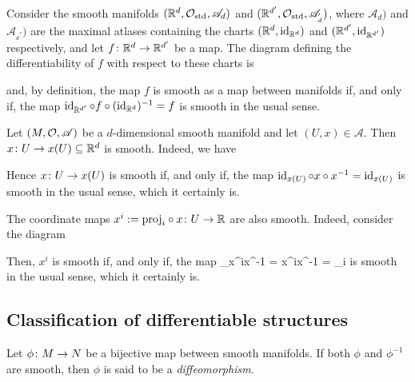 \be
Consider the smooth manifolds $(\mathbb{R}^d,\mathcal{O}_\mathrm{std},\mathscr{A}_d)$ and $(\mathbb{R}^{d'},\mathcal{O}_\mathrm{std},\mathscr{A}_{_d'})$, where $\mathscr{A}_d)$ and $\mathscr{A}_{_d'})$ are the maximal atlases containing the charts $(\mathbb{R}^d,\operatorname{id}_{\mathbb{R}^d})$ and $(\mathbb{R}^{d'},\operatorname{id}_{\mathbb{R}^{d'}})$ respectively, and let $f\colon \mathbb{R}^{d}\to \mathbb{R}^{d'}$ be a map. The diagram defining the differentiability of $f$ with respect to these charts is
\bse
{}
\ese
and, by definition, the map $f$ is smooth as a map between manifolds if, and only if, the map $\operatorname{id}_{\mathbb{R}^{d'}}\circ f\circ (\operatorname{id}_{\mathbb{R}^d})^{-1}=f$ is smooth in the usual sense.
\ee

\be
Let $(M,\mathcal{O},\mathscr{A})$ be a $d$-dimensional smooth manifold and let $(U,x)\in\mathscr{A}$. Then $x\colon U \to x(U)\subseteq \mathbb{R}^d$ is smooth. Indeed, we have
\bse
{}
\ese
Hence $x\colon U \to x(U)$ is smooth if, and only if, the map $\operatorname{id}_{x(U)}\circ x\circ x^{-1}=\operatorname{id}_{x(U)}$ is smooth in the usual sense, which it certainly is.

The coordinate maps $x^i:={\operatorname{proj}_i}\circ x\colon U \to \mathbb{R}$ are also smooth. Indeed, consider the diagram
\bse
{}
\ese
Then, $x^i$ is smooth if, and only if, the map
\bse
{\id_\R}\circ x^i\circ x^{-1} =  x^i\circ x^{-1} = \proj_i
\ese
is smooth in the usual sense, which it certainly is.
\ee

\subsection{Classification of differentiable structures}

\bd
Let $\phi\colon M \to N$ be a bijective map between smooth manifolds. If both $\phi$ and $\phi^{-1}$ are smooth, then $\phi$ is said to be a \emph{diffeomorphism}.
\ed

